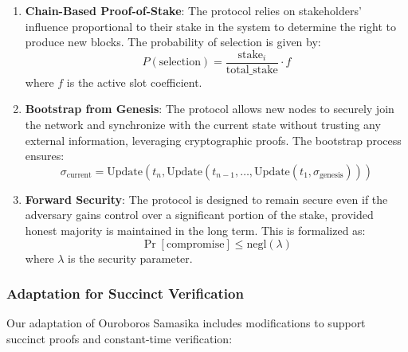 \documentclass{article}
\theoremstyle{plain}
\theoremstyle{definition}
\theoremstyle{remark}
\theoremstyle{problem}
\begin{document}
\begin{enumerate}
    \item \textbf{Chain-Based Proof-of-Stake}: The protocol relies on stakeholders' influence proportional to their stake in the system to determine the right to produce new blocks. The probability of selection is given by:
    \[
    P(\text{selection}) = \frac{\text{stake}_i}{\text{total\_stake}} \cdot f
    \]
    where $f$ is the active slot coefficient.

    \item \textbf{Bootstrap from Genesis}: The protocol allows new nodes to securely join the network and synchronize with the current state without trusting any external information, leveraging cryptographic proofs. The bootstrap process ensures:
    \[
    \sigma_{\text{current}} = \text{Update}(t_n, \text{Update}(t_{n-1}, \ldots, \text{Update}(t_1, \sigma_{\text{genesis}})))
    \]

    \item \textbf{Forward Security}: The protocol is designed to remain secure even if the adversary gains control over a significant portion of the stake, provided honest majority is maintained in the long term. This is formalized as:
    \[
    \Pr[\text{compromise}] \leq \text{negl}(\lambda)
    \]
    where $\lambda$ is the security parameter.
\end{enumerate}

\subsubsection{Adaptation for Succinct Verification}

Our adaptation of Ouroboros Samasika includes modifications to support succinct proofs and constant-time verification:
\end{document}
